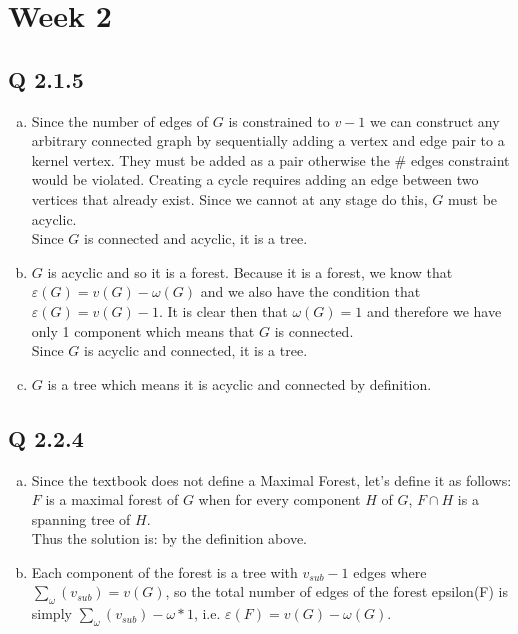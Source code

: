 
\chapter[Week 2]{Week 2}

\section{Q 2.1.5}
\begin{enumerate}[(a)]
\item Since the number of edges of $G$ is constrained to $v-1$ we can construct any arbitrary connected graph by sequentially adding a vertex and edge pair to a kernel vertex. They must be added as a pair otherwise the \# edges constraint would be violated. Creating a cycle requires adding an edge between two vertices that already exist. Since we cannot at any stage do this, $G$ must be acyclic.\\
Since $G$ is connected and acyclic, it is a tree.

\item $G$ is acyclic and so it is a forest. Because it is a forest, we know that $\varepsilon(G) = v(G) - \omega(G)$ and we also have the condition that $\varepsilon(G) = v(G) - 1$. It is clear then that $\omega(G) = 1$ and therefore we have only 1 component which means that $G$ is connected.\\
Since $G$ is acyclic and connected, it is a tree.

\item $G$ is a tree which means it is acyclic and connected by definition.
\end{enumerate}


\section{Q 2.2.4}
\begin{enumerate}[(a)]
\item Since the textbook does not define a Maximal Forest, let's define it as follows:\\
$F$ is a maximal forest of $G$ when for every component $H$ of $G$, $F \cap H$ is a spanning tree of $H$.\\
Thus the solution is: by the definition above.

\item Each component of the forest is a tree with $v_{sub}-1$ edges where $\sum_{\omega}(v_{sub}) = v(G)$, so the total number of edges of the forest epsilon(F) is simply $\sum_{\omega}(v_{sub}) - \omega* 1$, i.e. $\varepsilon(F) = v(G) - \omega(G)$.
\end{enumerate}

